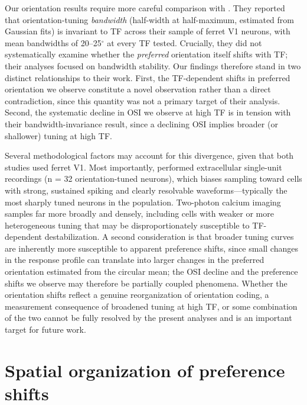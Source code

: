\documentclass{brandeis-thesis3.3}
\begin{document}
Our orientation results require more careful comparison with
\citet{Moore2005}. They reported that orientation-tuning
\emph{bandwidth} (half-width at half-maximum, estimated from
Gaussian fits) is invariant to TF across their sample of
ferret V1 neurons, with mean bandwidths of 20--25$^\circ$ at
every TF tested. Crucially, they did not systematically
examine whether the \emph{preferred} orientation itself
shifts with TF; their analyses focused on bandwidth
stability. Our findings therefore stand in two distinct
relationships to their work. First, the TF-dependent shifts
in preferred orientation we observe constitute a novel
observation rather than a direct contradiction, since this
quantity was not a primary target of their analysis. Second,
the systematic decline in OSI we observe at high TF is in
tension with their bandwidth-invariance result, since a
declining OSI implies broader (or shallower) tuning at high
TF.

Several methodological factors may account for this
divergence, given that both studies used ferret V1. Most
importantly, \citet{Moore2005} performed extracellular
single-unit recordings (n = 32 orientation-tuned neurons),
which biases sampling toward cells with strong, sustained
spiking and clearly resolvable waveforms---typically the most
sharply tuned neurons in the population. Two-photon calcium
imaging samples far more broadly and densely, including cells
with weaker or more heterogeneous tuning that may be
disproportionately susceptible to TF-dependent
destabilization. A second consideration is that broader
tuning curves are inherently more susceptible to apparent
preference shifts, since small changes in the response
profile can translate into larger changes in the preferred
orientation estimated from the circular mean; the OSI
decline and the preference shifts we observe may therefore
be partially coupled phenomena. Whether the orientation
shifts reflect a genuine reorganization of orientation
coding, a measurement consequence of broadened tuning at
high TF, or some combination of the two cannot be fully
resolved by the present analyses and is an important target
for future work.

\section*{Spatial organization of preference shifts}
\end{document}
